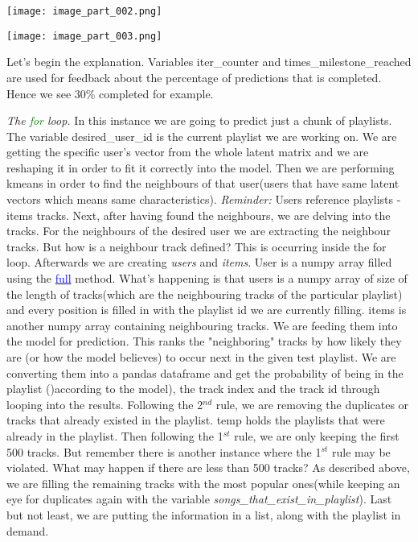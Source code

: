 \documentclass[]{article}
\begin{document}
\texttt{[image: image\_part\_002.png]}

\texttt{[image: image\_part\_003.png]}

Let's begin the explanation. Variables iter\_counter and times\_milestone\_reached are used for feedback about the percentage of predictions that is completed. Hence we see 30\% completed for example.

\textit{The \textcolor{Green}{for} loop.} In this instance we are going to predict just a chunk of playlists. The variable desired\_user\_id is the current playlist we are working on. We are getting the specific user's vector from the whole latent matrix and we are reshaping it in order to fit it correctly into the model. Then we are performing kmeans in order to find the neighbours of that user(users that have same latent vectors which means same characteristics). \textit{Reminder: } Users reference playlists - items tracks.
Next, after having found the neighbours, we are delving into the tracks. For the neighbours of the desired user we are extracting the neighbour tracks. But how is a neighbour track defined? This is occurring inside the for loop.
Afterwards we are creating \textit{users} and \textit{items}. User is a numpy array filled using the \href{https://numpy.org/doc/stable/reference/generated/numpy.full.html}{\textcolor{Blue}{full}} method. What's happening is that users is a numpy array of size of the length of tracks(which are the neighbouring tracks of the particular playlist) and every position is filled in with the playlist id we are currently filling. items is another numpy array containing neighbouring tracks. We are feeding them into the model for prediction. This ranks the "neighboring" tracks by how likely they are (or how the model believes) to occur next in the given test playlist.
We are converting them into a pandas dataframe and get the probability of being in the playlist ()according to the model), the track index and the track id through looping into the results.
Following the 2$^{nd}$ rule, we are removing the duplicates or tracks that already existed in the playlist. temp holds the playlists that were already in the playlist. Then following the 1$^{st}$ rule, we are only keeping the first 500 tracks. But remember there is another instance where the 1$^{st}$ rule may be violated. What may happen if there are less than 500 tracks? As described above, we are filling the remaining tracks with the most popular ones(while keeping an eye for duplicates again with the variable \textit{songs\_that\_exist\_in\_playlist}). Last but not least, we are putting the information in a list, along with the playlist in demand.
\end{document}
